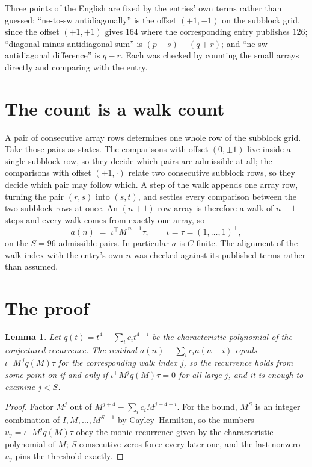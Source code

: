 \documentclass[11pt,a4paper]{article}
\theoremstyle{plain}
\newtheorem{lemma}[theorem]{Lemma}
\theoremstyle{definition}
\begin{document}
Three points of the English are fixed by the entries' own terms rather than guessed:
``ne-to-sw antidiagonally'' is the offset $(+1,-1)$ on the subblock grid, since the offset
$(+1,+1)$ gives $164$ where the corresponding entry publishes $126$; ``diagonal minus
antidiagonal sum'' is $(p+s)-(q+r)$; and ``ne-sw antidiagonal difference'' is $q-r$. Each was
checked by counting the small arrays directly and comparing with the entry.

\section{The count is a walk count}

A pair of consecutive array rows determines one whole row of the subblock grid. Take those
pairs as states. The comparisons with offset $(0,\pm1)$ live inside a single subblock row, so
they decide which pairs are admissible at all; the comparisons with offset $(\pm1,\cdot)$
relate two consecutive subblock rows, so they decide which pair may follow which. A step of the
walk appends one array row, turning the pair $(r,s)$ into $(s,t)$, and settles every comparison
between the two subblock rows at once. An $(n+1)$-row array is therefore a walk of $n-1$ steps
and every walk comes from exactly one array, so
\[
a(n)\;=\;\iota^{\!\top}M^{\,n-1}\tau,\qquad \iota=\tau=(1,\dots,1)^{\!\top},
\]
on the $S=96$ admissible pairs. In particular $a$ is $C$-finite. The alignment of the walk
index with the entry's own $n$ was checked against its published terms rather than assumed.

\section{The proof}

\begin{lemma}\label{lem:crit}
Let $q(t)=t^{4}-\sum_i c_it^{4-i}$ be the characteristic polynomial of the
conjectured recurrence. The residual $a(n)-\sum_ic_ia(n-i)$ equals
$\iota^{\!\top}M^{\,j}q(M)\tau$ for the corresponding walk index $j$, so the recurrence
holds from some point on if and only if $\iota^{\!\top}M^{j}q(M)\tau=0$ for all large $j$,
and it is enough to examine $j<S$.
\end{lemma}

\begin{proof}
Factor $M^{j}$ out of $M^{j+4}-\sum_ic_iM^{j+4-i}$. For the bound, $M^{S}$
is an integer combination of $I,M,\dots,M^{S-1}$ by Cayley--Hamilton, so the numbers
$u_j=\iota^{\!\top}M^{j}q(M)\tau$ obey the monic recurrence given by the characteristic
polynomial of $M$; $S$ consecutive zeros force every later one, and the last nonzero $u_j$
pins the threshold exactly.
\end{proof}
\end{document}

